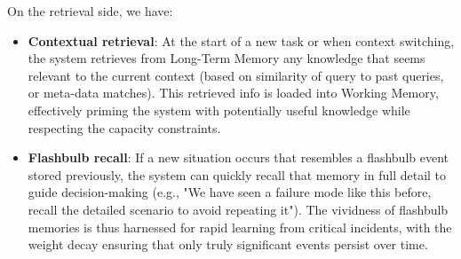 \documentclass{article}
\begin{document}
On the retrieval side, we have:
\begin{itemize}
\item \textbf{Contextual retrieval}: At the start of a new task or when context switching, the system retrieves from Long-Term Memory any knowledge that seems relevant to the current context (based on similarity of query to past queries, or meta-data matches). This retrieved info is loaded into Working Memory, effectively priming the system with potentially useful knowledge while respecting the capacity constraints.

\item \textbf{Flashbulb recall}: If a new situation occurs that resembles a flashbulb event stored previously, the system can quickly recall that memory in full detail to guide decision-making (e.g., "We have seen a failure mode like this before, recall the detailed scenario to avoid repeating it"). The vividness of flashbulb memories is thus harnessed for rapid learning from critical incidents, with the weight decay ensuring that only truly significant events persist over time.
\end{itemize}
\end{document}
